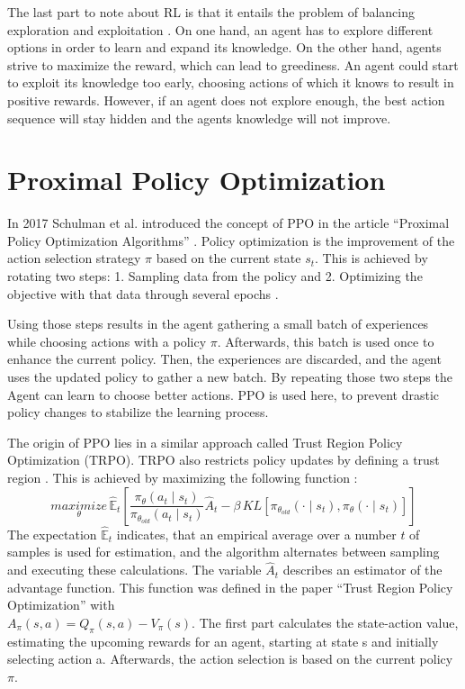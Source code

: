 The last part to note about RL is that it entails the problem of balancing exploration and exploitation \cite{suba18}. On one hand, an agent has to explore different options in order to learn and expand its knowledge. On the other hand, agents strive to maximize the reward, which can lead to greediness. An agent could start to exploit its knowledge too early, choosing actions of which it knows to result in positive rewards. However, if an agent does not explore enough, the best action sequence will stay hidden and the agents knowledge will not improve.

\section{Proximal Policy Optimization}
In 2017 Schulman et al. introduced the concept of PPO in the article ``Proximal Policy Optimization Algorithms'' \cite{scwo17}. Policy optimization is the improvement of the action selection strategy $\pi$ based on the current state $s_{t}$. This is achieved by rotating two steps: 1. Sampling data from the policy and 2. Optimizing the objective with that data through several epochs \cite{scwo17}.

Using those steps results in the agent gathering a small batch of experiences while choosing actions with a policy $\pi$. Afterwards, this batch is used once to enhance the current policy. Then, the experiences are discarded, and the agent uses the updated policy to gather a new batch. By repeating those two steps the Agent can learn to choose better actions. PPO is used here, to prevent drastic policy changes to stabilize the learning process.

The origin of PPO lies in a similar approach called Trust Region Policy Optimization (TRPO). TRPO also restricts policy updates by defining a trust region \cite{scle15}. This is achieved by maximizing the following function \cite{scwo17}:
\begin{equation}\label{eq:TRPO}
    \underset{\theta}{maximize}\,\hat{\mathbb{E}}_{t} \left[ \frac{\pi_{\theta}(a_{t} \mid s_{t})}{\pi_{\theta_{old}}(a_{t} \mid s_{t})}
        \hat{A}_{t}-\beta \, KL[\pi_{\theta_{old}}(\cdot \mid s_{t}),\pi_{\theta}(\cdot \mid s_{t})] \right]
\end{equation}
The expectation $\hat{\mathbb{E}}_{t}$ indicates, that an empirical average over a number $t$ of samples is used for estimation, and the algorithm alternates between sampling and executing these calculations. The variable $\hat{A}_{t}$ describes an estimator of the advantage function. This function was defined in the paper ``Trust Region Policy Optimization'' \cite{scle15} with \\ $A_\pi(s,a) = Q_\pi(s,a)-V_\pi(s)$. The first part calculates the state-action value, estimating the upcoming rewards for an agent, starting at state s and initially selecting action a. Afterwards, the action selection is based on the current policy $\pi$. 

